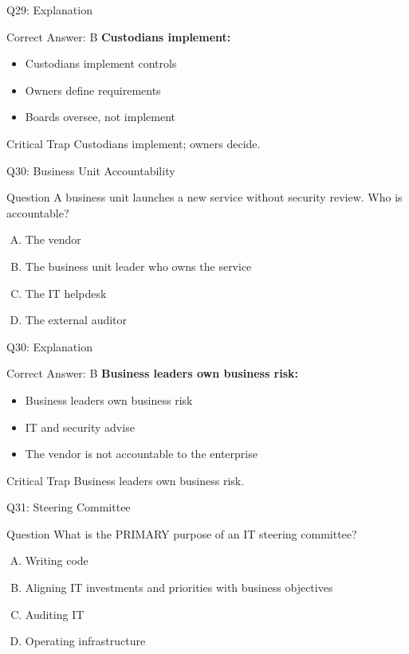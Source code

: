 \documentclass{beamer}
\begin{document}
	\begin{frame}{Q29: Explanation}
		\begin{block}{Correct Answer: B}
			\textbf{Custodians implement:}
			\begin{itemize}
				\item Custodians implement controls
				\item Owners define requirements
				\item Boards oversee, not implement
			\end{itemize}
		\end{block}
		\begin{alertblock}{Critical Trap}
			Custodians implement; owners decide.
		\end{alertblock}
	\end{frame}
	
	\begin{frame}{Q30: Business Unit Accountability}
		\begin{block}{Question}
			A business unit launches a new service without security review. Who is accountable?
		\end{block}
		\begin{enumerate}[(A)]
			\item The vendor
			\item The business unit leader who owns the service
			\item The IT helpdesk
			\item The external auditor
		\end{enumerate}
	\end{frame}
	
	\begin{frame}{Q30: Explanation}
		\begin{block}{Correct Answer: B}
			\textbf{Business leaders own business risk:}
			\begin{itemize}
				\item Business leaders own business risk
				\item IT and security advise
				\item The vendor is not accountable to the enterprise
			\end{itemize}
		\end{block}
		\begin{alertblock}{Critical Trap}
			Business leaders own business risk.
		\end{alertblock}
	\end{frame}
	
	\begin{frame}{Q31: Steering Committee}
		\begin{block}{Question}
			What is the PRIMARY purpose of an IT steering committee?
		\end{block}
		\begin{enumerate}[(A)]
			\item Writing code
			\item Aligning IT investments and priorities with business objectives
			\item Auditing IT
			\item Operating infrastructure
		\end{enumerate}
	\end{frame}
	
\end{document}
